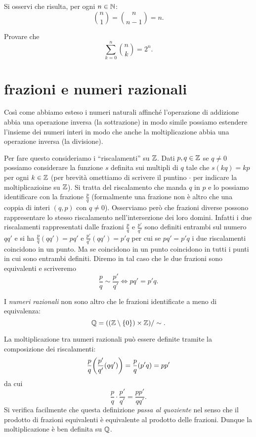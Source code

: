 Si osservi che risulta, per ogni $n\in {\mathbb N}$:
\[
  {n \choose 1} = {n \choose n-1} = n.
\]
  
\begin{exercise}
  Provare che
  \[
   \sum_{k=0}^n {n \choose k} = 2^n.
  \]
\end{exercise}  
  
\section{frazioni e numeri razionali}

Così come abbiamo esteso i numeri naturali affinché l'operazione di addizione abbia 
una operazione inversa (la sottrazione) in modo simile possiamo estendere l'insieme 
dei numeri interi in modo che anche la moltiplicazione abbia una operazione inversa 
(la divisione).

Per fare questo consideriamo i ``riscalamenti'' su ${\mathbb Z}$. Dati $p,q\in {\mathbb Z}$ se 
$q\neq 0$ possiamo considerare la funzione $s$ definita sui multipli di $q$ 
tale che $s(kq) = kp$ per ogni $k\in {\mathbb Z}$ (per brevità omettiamo di scrivere 
il puntino $\cdot$ per indicare la moltiplicazioine su ${\mathbb Z}$).
Si tratta del riscalamento che manda $q$ in $p$ e lo possiamo identificare 
con la frazione $\frac{p}{q}$ (formalmente una frazione non è altro che una 
coppia di interi $(q,p)$ con $q\neq 0$).
Osserviamo però che frazioni diverse possono rappresentare lo stesso riscalamento 
nell'intersezione dei loro domini. 
Infatti i due riscalamenti rappresentati dalle frazioni $\frac{p}{q}$ e $\frac{p'}{q'}$
sono definiti entrambi sul numero $qq'$ e si ha
$\frac{p}{q}(qq') = pq'$ e  $\frac{p'}{q'}(qq')=p'q$ per cui se $pq'=p'q$
i due riscalamenti coincidono in un punto. Ma se coincidono in un punto coincidono 
in tutti i punti in cui sono entrambi definiti. 
Diremo in tal caso che le due frazioni sono equivalenti e scriveremo 
\[
  \frac{p}{q} \sim \frac{p'}{q'} \iff pq'=p'q.  
\]

I \emph{numeri razionali} non sono altro che le frazioni identificate 
a meno di equivalenza:
\[
  {\mathbb Q} = (({\mathbb Z}\setminus{\left\{ 0 \right\}})\times {\mathbb Z})/\sim.
\]

La moltiplicazione tra numeri razionali può essere definite tramite la composizione 
dei riscalamenti:
\[
  \frac{p}{q}{\left( \frac{p'}{q'} (qq') \right)} = \frac{p}{q}(p'q) = pp'
\]
da cui 
\[
 \frac{p}{q} \cdot \frac{p'}{q'} = \frac{pp'}{qq'}.  
\]
Si verifica facilmente che questa definizione \emph{passa al quoziente} 
nel senso che il prodotto di frazioni equivalenti è equivalente al prodotto 
delle frazioni. 
Dunque la moltiplicazione è ben definita su ${\mathbb Q}$.

